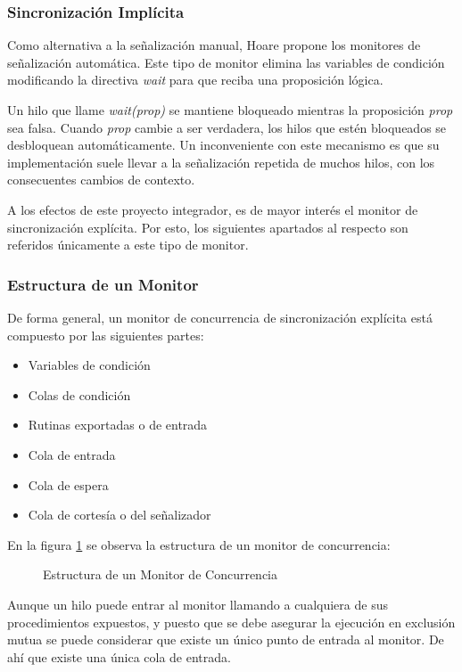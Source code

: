 \subsubsection{Sincronización Implícita}

Como alternativa a la señalización manual, Hoare propone los monitores de
señalización automática. Este tipo de monitor elimina las variables de
condición modificando la directiva \textit{wait} para que reciba una proposición
lógica.

Un hilo que llame \textit{wait(prop)} se mantiene bloqueado mientras la
proposición \textit{prop} sea falsa. Cuando \textit{prop} cambie a ser
verdadera, los hilos que estén bloqueados se desbloquean automáticamente.
Un inconveniente con este mecanismo es que su implementación suele llevar a la
señalización repetida de muchos hilos, con los consecuentes cambios de contexto.

A los efectos de este proyecto integrador, es de mayor interés el monitor de
sincronización explícita. Por esto, los siguientes apartados al respecto son
referidos únicamente a este tipo de monitor.

\subsubsection{Estructura de un Monitor}
De forma general, un monitor de concurrencia de sincronización explícita está
compuesto por las siguientes partes:
\begin{itemize}
    \item Variables de condición
    \item Colas de condición
    \item Rutinas exportadas o de entrada
    \item Cola de entrada
    \item Cola de espera
    \item Cola de cortesía o del señalizador
\end{itemize}

En la figura \ref{fig:monitor01} se observa la estructura de un monitor de
concurrencia:

\begin{figure}[H]
  \centering
  \caption{Estructura de un Monitor de Concurrencia}
  \label{fig:monitor01}
\end{figure}

Aunque un hilo puede entrar al monitor llamando a cualquiera de sus
procedimientos expuestos, y puesto que se debe asegurar la ejecución en
exclusión mutua se puede considerar que existe un único punto de entrada al
monitor. De ahí que existe una única cola de entrada.

